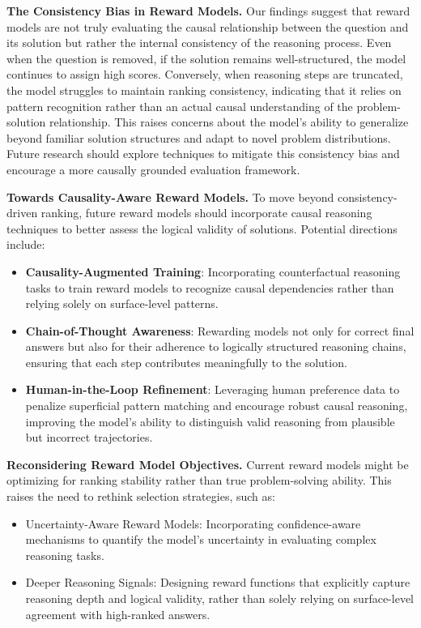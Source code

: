 \documentclass{article}
\begin{document}
\textbf{The Consistency Bias in Reward Models.} Our findings suggest that reward models are not truly evaluating the causal relationship between the question and its solution but rather the internal consistency of the reasoning process. Even when the question is removed, if the solution remains well-structured, the model continues to assign high scores. Conversely, when reasoning steps are truncated, the model struggles to maintain ranking consistency, indicating that it relies on pattern recognition rather than an actual causal understanding of the problem-solution relationship. This raises concerns about the model’s ability to generalize beyond familiar solution structures and adapt to novel problem distributions. Future research should explore techniques to mitigate this consistency bias and encourage a more causally grounded evaluation framework.

\textbf{Towards Causality-Aware Reward Models.}
To move beyond consistency-driven ranking, future reward models should incorporate causal reasoning techniques to better assess the logical validity of solutions. Potential directions include:
\begin{itemize}
    \item \textbf{Causality-Augmented Training}: Incorporating counterfactual reasoning tasks to train reward models to recognize causal dependencies rather than relying solely on surface-level patterns.
    \item \textbf{Chain-of-Thought Awareness}: Rewarding models not only for correct final answers but also for their adherence to logically structured reasoning chains, ensuring that each step contributes meaningfully to the solution.
    \item \textbf{Human-in-the-Loop Refinement}: Leveraging human preference data to penalize superficial pattern matching and encourage robust causal reasoning, improving the model’s ability to distinguish valid reasoning from plausible but incorrect trajectories.
\end{itemize}





\textbf{Reconsidering Reward Model Objectives.} Current reward models might be optimizing for ranking stability rather than true problem-solving ability. This raises the need to rethink selection strategies, such as:
\begin{itemize}
    \item Uncertainty-Aware Reward Models: Incorporating confidence-aware mechanisms to quantify the model’s uncertainty in evaluating complex reasoning tasks.
    \item Deeper Reasoning Signals: Designing reward functions that explicitly capture reasoning depth and logical validity, rather than solely relying on surface-level agreement with high-ranked answers.
\end{itemize}





\end{document}

